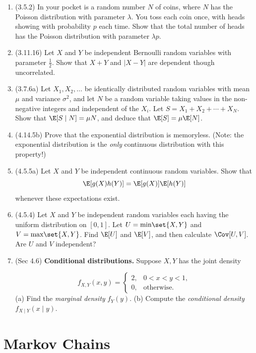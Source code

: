 \documentclass{article} %
\begin{document}
\begin{enumerate}
\item (3.5.2) In your pocket is a random number $N$ of coins, where $N$ has the Poisson distribution with parameter $\lambda$.  You toss each coin once, with heads showing with probability $p$ each time.  Show that the total number of heads has the Poisson distribution with parameter $\lambda p$.
\item (3.11.16) Let $X$ and $Y$ be independent Bernoulli random variables with parameter $\frac{1}{2}$.  Show that $X+Y$ and $|X-Y|$ are dependent though uncorrelated.
\item (3.7.6a) Let $X_1, X_2, \hdots$ be identically distributed random variables with mean $\mu$ and variance $\sigma^2$, and let $N$ be a random variable taking values in the non-negative integers and independent of the $X_i$.  Let $S=X_1+X_2+\cdots+X_N$.    Show that $\E[S \mid N] = \mu N$, and deduce that $\E[S]=\mu \E[N]$. 
\item (4.14.5b) Prove that the exponential distribution is memoryless.  (Note: the exponential distribution is the \textit{only} continuous distribution with this property!)
\item (4.5.5a) Let $X$ and $Y$ be independent continuous random variables.  Show that
\[ \E[g(X)h(Y)]= \E[g(X)] \E[h(Y)] \]
whenever these expectations exist.  %
\item (4.5.4) Let $X$ and $Y$ be independent random variables each having the uniform distribution on $[0,1]$.  Let $U=\text{min}\set{X,Y}$ and  $V=\text{max}\set{X,Y}$.  Find $\E[U]$ and $\E[V]$, and then calculate $\Cov[U,V]$.   Are $U$ and $V$ independent? 
\item (Sec 4.6) \textbf{Conditional distributions.} Suppose $X,Y$ has the joint density

\[ f_{X,Y}(x,y) =
\begin{cases}
2, & 0 < x < y < 1, \\
0, & \text{otherwise}.
\end{cases}
\]
(a) Find the \textit{marginal density} $f_Y(y)$. (b) Compute the \textit{conditional density} $f_{X\mid Y}(x \mid y)$. 
\end{enumerate}

\section{Markov Chains}
\end{document}
